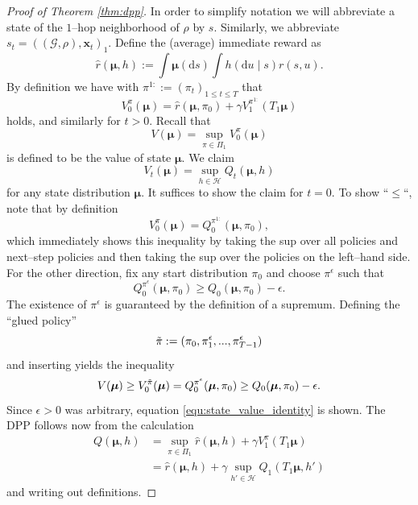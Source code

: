 \documentclass{article}
\begin{document}
\begin{proof}[Proof of Theorem \ref{thm:dpp}]
    In order to simplify notation we will abbreviate a state of the $1$--hop neighborhood of $\rho$ by $s$. Similarly, we  abbreviate $s_t = ((\mathcal G,\rho), \mathbf x_t)_1$. Define the (average) immediate reward as
    $$
    \hat{r}(\boldsymbol \mu,h) :=  \int \boldsymbol \mu(\mathrm d s) \int h(\mathrm d u \mid s) r(s,u).
    $$
    By definition we have with $\pi^{1:} := (\pi_{t})_{1 \le t \le T}$ that
    $$
    V_0 ^{\pi} (\boldsymbol \mu) = \hat{r}(\boldsymbol \mu,\pi_0) +  \gamma V^{\pi^{1:}} _{1}(T_1\boldsymbol \mu)
    $$
    holds, and similarly for $t>0$. Recall that
    $$
    V (\boldsymbol \mu) = \sup_{\pi \in \Pi_1} V_0 ^{\pi}(\boldsymbol \mu)
    $$
    is defined to be the value of state $\boldsymbol \mu$. We claim
    \begin{equation}
        \label{equ:state_value_identity}
        V_t( \boldsymbol \mu) = \sup\limits_{h \in \mathcal H} Q_t(\boldsymbol \mu,h)
    \end{equation}
    for any state distribution $\boldsymbol \mu$. It suffices to show the claim for $t=0$.
    To show ``$\le$``, note that by definition
    $$
    V_0 ^{\pi} (\boldsymbol \mu) = Q_0^{\pi^{1:}}(\boldsymbol \mu,\pi_0 ),
    $$
    which immediately shows this inequality by taking the sup over all policies and next--step policies and then taking the sup over the policies on the left--hand side.
    For the other direction, fix any start distribution $\pi_0$ and choose $\pi^\epsilon$ such that
    $$
    Q_0^{\pi^\epsilon}(\boldsymbol \mu,\pi_0) \ge Q_0(\boldsymbol \mu,\pi_0)-\epsilon.
    $$
    The existence of $\pi^\epsilon$ is guaranteed by the definition of a supremum. Defining the ``glued policy''
    $$
    \Tilde{ \pi} := (\pi_0,\pi^\epsilon_1,...,\pi^\epsilon _{T-1})
    $$
    and inserting yields the inequality
    $$
    V(\boldsymbol \mu) \ge V_0 ^{\Tilde \pi}(\boldsymbol \mu) = Q_0^{\pi^\epsilon}(\boldsymbol \mu,\pi_0) \ge Q_0(\boldsymbol \mu,\pi_0)-\epsilon.
    $$
    Since $\epsilon > 0$ was arbitrary, equation \eqref{equ:state_value_identity} is shown. The DPP follows now from the calculation
    \begin{equation}
        \nonumber
        \begin{split}
            Q(\boldsymbol \mu,h) &= \sup\limits_{\pi \in \Pi_1} \hat{r}(\boldsymbol \mu,h) + \gamma V^{\pi} _{1}( T_1 \boldsymbol \mu)\\
            &= \hat{r}(\boldsymbol \mu,h) + \gamma \sup\limits_{h' \in \mathcal H} Q_1( T_1 \boldsymbol \mu,h')
        \end{split}
    \end{equation}
and writing out definitions. 
\end{proof}
\end{document}
